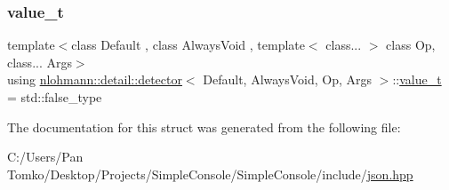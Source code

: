 \mbox{\label{structnlohmann_1_1detail_1_1detector_a5a132aab543d1706e2439268faf8d487}} 
\subsubsection{\texorpdfstring{value\_t}{value\_t}}
{\footnotesize\ttfamily template$<$class Default , class Always\+Void , template$<$ class... $>$ class Op, class... Args$>$ \\
using \mbox{\hyperlink{structnlohmann_1_1detail_1_1detector}{nlohmann\+::detail\+::detector}}$<$ Default, Always\+Void, Op, Args $>$\+::\mbox{\hyperlink{structnlohmann_1_1detail_1_1detector_a5a132aab543d1706e2439268faf8d487}{value\+\_\+t}} =  std\+::false\+\_\+type}



The documentation for this struct was generated from the following file\+:\begin{DoxyCompactItemize}
\item 
C\+:/\+Users/\+Pan Tomko/\+Desktop/\+Projects/\+Simple\+Console/\+Simple\+Console/include/\mbox{\hyperlink{json_8hpp}{json.\+hpp}}\end{DoxyCompactItemize}

